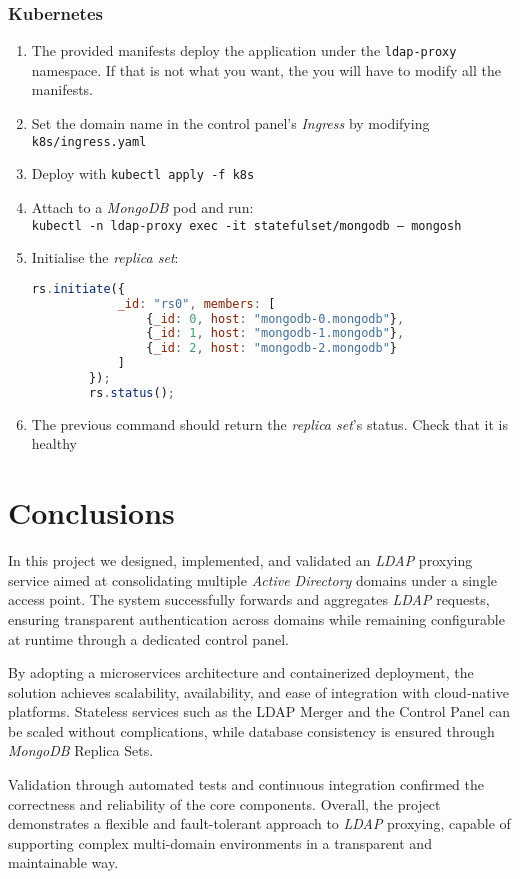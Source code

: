 \documentclass{scrartcl}
\begin{document}
\subsubsection{Kubernetes}
\begin{enumerate}
	\item The provided manifests deploy the application under the \texttt{ldap-proxy} namespace. If that is not what you want, the you will have to modify all the manifests.
	\item Set the domain name in the control panel's \textit{Ingress} by modifying \texttt{k8s/ingress.yaml} 
	\item Deploy with \texttt{kubectl apply -f k8s}
	\item Attach to a \textit{MongoDB} pod and run:\\
		\texttt{kubectl -n ldap-proxy exec -it statefulset/mongodb -- mongosh}
	\item Initialise the \textit{replica set}:
		\begin{lstlisting}[language=javascript]
		rs.initiate({
			_id: "rs0", members: [
				{_id: 0, host: "mongodb-0.mongodb"},
				{_id: 1, host: "mongodb-1.mongodb"},
				{_id: 2, host: "mongodb-2.mongodb"}
			]
		});
		rs.status();
		\end{lstlisting}
	\item The previous command should return the \textit{replica set}'s status. Check that it is healthy
\end{enumerate}

\section{Conclusions}

\par In this project we designed, implemented, and validated an \textit{LDAP} proxying service aimed at consolidating multiple \textit{Active Directory} domains under a single access point. The system successfully forwards and aggregates \textit{LDAP} requests, ensuring transparent authentication across domains while remaining configurable at runtime through a dedicated control panel.
\par By adopting a microservices architecture and containerized deployment, the solution achieves scalability, availability, and ease of integration with cloud-native platforms. Stateless services such as the LDAP Merger and the Control Panel can be scaled without complications, while database consistency is ensured through \textit{MongoDB} Replica Sets.
\par Validation through automated tests and continuous integration confirmed the correctness and reliability of the core components. Overall, the project demonstrates a flexible and fault-tolerant approach to \textit{LDAP} proxying, capable of supporting complex multi-domain environments in a transparent and maintainable way.

\nocite{*} %
% 
% 

\printbibliography
\tableofcontents
\end{document}
